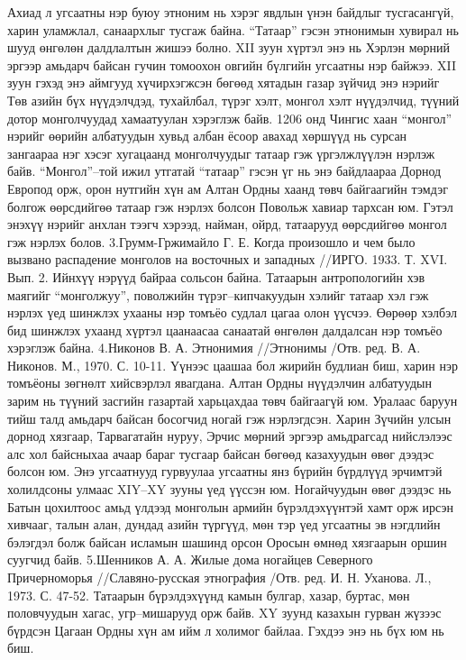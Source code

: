 Ахиад л угсаатны нэр буюу этноним нь хэрэг явдлын үнэн байдлыг тусгасангүй, харин уламжлал, санаархлыг тусгаж байна.
“Татаар” гэсэн этнонимын хувирал нь шууд өнгөлөн далдлалтын жишээ болно. XII зуун хүртэл энэ нь Хэрлэн мөрний эргээр амьдарч байсан гучин томоохон овгийн бүлгийн угсаатны нэр байжээ. XII зуун гэхэд энэ аймгууд хүчирхэгжсэн бөгөөд хятадын газар зүйчид энэ нэрийг Төв азийн бүх нүүдэлчдэд, тухайлбал, түрэг хэлт, монгол хэлт нүүдэлчид, түүний дотор монголчуудад хамаатуулан хэрэглэж байв. 1206 онд Чингис хаан “монгол” нэрийг өөрийн албатуудын хувьд албан ёсоор авахад хөршүүд нь сурсан зангаараа нэг хэсэг хугацаанд монголчуудыг татаар гэж үргэлжлүүлэн нэрлэж байв. “Монгол”–той ижил утгатай “татаар” гэсэн үг нь энэ байдлаараа Дорнод Европод орж, орон нутгийн хүн ам Алтан Ордны хаанд төвч байгаагийн тэмдэг болгож өөрсдийгөө татаар гэж нэрлэх болсон Повольж хавиар тархсан юм. Гэтэл энэхүү нэрийг анхлан тээгч хэрээд, найман, ойрд, татаарууд өөрсдийгөө монгол гэж нэрлэх болов. 3.Грумм-Гржимайло Г. Е. Когда произошло и чем было вызвано распадение монголов на восточных и западных //ИРГО. 1933. Т. XVI. Вып. 2.
Ийнхүү нэрүүд байраа сольсон байна. Татаарын антропологийн хэв маягийг “монголжуу”, поволжийн түрэг–кипчакуудын хэлийг татаар хэл гэж нэрлэх үед шинжлэх ухааны нэр томъёо судлал цагаа олон үүсчээ. Өөрөөр хэлбэл бид шинжлэх ухаанд хүртэл цаанаасаа санаатай өнгөлөн далдалсан нэр томъёо хэрэглэж байна. 4.Никонов В. А. Этнонимия //Этнонимы /Отв. ред. В. А. Никонов. М., 1970. С. 10-11.
Үүнээс цаашаа бол жирийн будлиан биш, харин нэр томъёоны зөгнөлт хийсвэрлэл явагдана. Алтан Ордны нүүдэлчин албатуудын зарим нь түүний засгийн газартай харьцахдаа төвч байгаагүй юм. Уралаас баруун тийш талд амьдарч байсан босогчид ногай гэж нэрлэгдсэн. Харин Зүчийн улсын дорнод хязгаар, Тарвагатайн нуруу, Эрчис мөрний эргээр амьдрагсад нийслэлээс алс хол байсныхаа ачаар бараг тусгаар байсан бөгөөд казахуудын өвөг дээдэс болсон юм. Энэ угсаатнууд гурвуулаа угсаатны янз бүрийн бүрдлүүд эрчимтэй холилдсоны улмаас XIY–XY зууны үед үүссэн юм. Ногайчуудын өвөг дээдэс нь Батын цохилтоос амьд үлдээд монголын армийн бүрэлдэхүүнтэй хамт орж ирсэн хивчааг, талын алан, дундад азийн түргүүд, мөн тэр үед угсаатны эв нэгдлийн бэлэгдэл болж байсан исламын шашинд орсон Оросын өмнөд хязгаарын оршин суугчид байв. 5.Шенников А. А. Жилые дома ногайцев Северного Причерноморья //Славяно-русская этнография /Отв. ред. И. Н. Уханова. Л., 1973. С. 47-52.
Татаарын бүрэлдэхүүнд камын булгар, хазар, буртас, мөн половчуудын хагас, угр–мишарууд орж байв. XY зуунд казахын гурван жүзээс бүрдсэн Цагаан Ордны хүн ам ийм л холимог байлаа. Гэхдээ энэ нь бүх юм нь биш.
